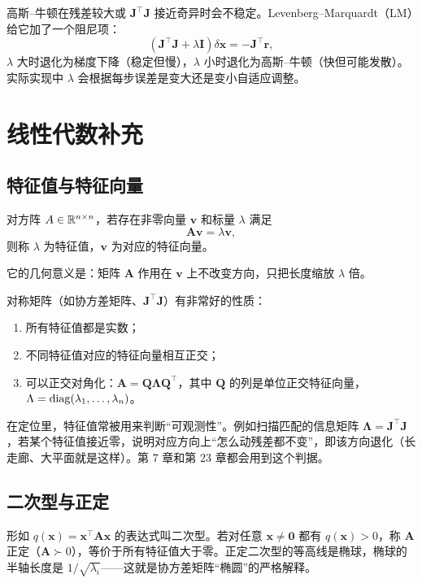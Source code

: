 高斯--牛顿在残差较大或 $\bm{J}^{\top}\bm{J}$ 接近奇异时会不稳定。Levenberg--Marquardt（LM）给它加了一个阻尼项：
\begin{equation}
\left(\bm{J}^{\top}\bm{J}+\lambda\bm{I}\right)\delta\bm{x}=-\bm{J}^{\top}\bm{r},
\label{eq:02-lm}
\end{equation}
$\lambda$ 大时退化为梯度下降（稳定但慢），$\lambda$ 小时退化为高斯--牛顿（快但可能发散）。实际实现中 $\lambda$ 会根据每步误差是变大还是变小自适应调整。

\section{线性代数补充}\label{sec:02-linalg}

\subsection{特征值与特征向量}

\begin{definition}[特征值与特征向量]
对方阵 $A\in\mathbb{R}^{n\times n}$，若存在非零向量 $\bm{v}$ 和标量 $\lambda$ 满足
\begin{equation}
\bm{A}\bm{v}=\lambda\bm{v},
\end{equation}
则称 $\lambda$ 为特征值，$\bm{v}$ 为对应的特征向量。
\end{definition}
它的几何意义是：矩阵 $\bm{A}$ 作用在 $\bm{v}$ 上不改变方向，只把长度缩放 $\lambda$ 倍。

对称矩阵（如协方差矩阵、$\bm{J}^{\top}\bm{J}$）有非常好的性质：
\begin{enumerate}
  \item 所有特征值都是实数；
  \item 不同特征值对应的特征向量相互正交；
  \item 可以正交对角化：$\bm{A}=\bm{Q}\bm{\Lambda}\bm{Q}^{\top}$，其中 $\bm{Q}$ 的列是单位正交特征向量，$\Lambda=\operatorname{diag}(\lambda_1,\dots,\lambda_n)$。
\end{enumerate}

在定位里，特征值常被用来判断“可观测性”。例如扫描匹配的信息矩阵 $\bm{\Lambda}=\bm{J}^{\top}\bm{J}$，若某个特征值接近零，说明对应方向上“怎么动残差都不变”，即该方向退化（长走廊、大平面就是这样）。第 7 章和第 23 章都会用到这个判据。

\subsection{二次型与正定}

形如 $q(\bm{x})=\bm{x}^{\top}\bm{A}\bm{x}$ 的表达式叫二次型。若对任意 $\bm{x}\neq\bm{0}$ 都有 $q(\bm{x})>0$，称 $\bm{A}$ 正定（$\bm{A}\succ0$），等价于所有特征值大于零。正定二次型的等高线是椭球，椭球的半轴长度是 $1/\sqrt{\lambda_i}$——这就是协方差矩阵“椭圆”的严格解释。


